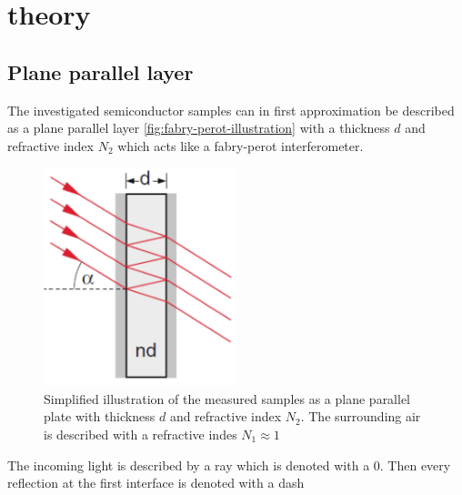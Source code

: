 \nopagebreak
\section{theory}
\subsection{Plane parallel layer}
The investigated semiconductor samples can in first approximation be described as a plane parallel 
layer \ref{fig:fabry-perot-illustration} with a thickness $d$ and refractive index $N_2$ which acts like a fabry-perot interferometer.
\begin{figure}[h]\label{fig:fabry-perot-illustration}
    \centering
    \includegraphics[width=0.5\textwidth]{Images/Fabry-Perot.png}
    \caption{Simplified illustration of the measured samples as a plane parallel plate
    with thickness $d$ and refractive index $N_2$. The surrounding air is described with a 
    refractive indes $N_1\approx1$ \cite{Gerthsen}}
    \label{fig:layer}
\end{figure}
The incoming light is described by a ray which is denoted with a 0. Then every reflection at the first 
interface is denoted with a dash